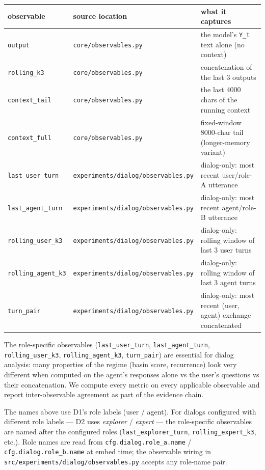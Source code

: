\documentclass{article}
\theoremstyle{plain}
\theoremstyle{definition}
\begin{document}
\begin{table}[h!]
\centering
\small
\begin{tabular}{lll}
\toprule
observable & source location & what it captures \\
\midrule
\texttt{output} & \texttt{core/observables.py} & the model's \texttt{Y\_t} text alone (no context) \\
\texttt{rolling\_k3} & \texttt{core/observables.py} & concatenation of the last 3 outputs \\
\texttt{context\_tail} & \texttt{core/observables.py} & the last 4000 chars of the running context \\
\texttt{context\_full} & \texttt{core/observables.py} & fixed-window 8000-char tail (longer-memory variant) \\
\texttt{last\_user\_turn} & \texttt{experiments/dialog/observables.py} & dialog-only: most recent user/role-A utterance \\
\texttt{last\_agent\_turn} & \texttt{experiments/dialog/observables.py} & dialog-only: most recent agent/role-B utterance \\
\texttt{rolling\_user\_k3} & \texttt{experiments/dialog/observables.py} & dialog-only: rolling window of last 3 user turns \\
\texttt{rolling\_agent\_k3} & \texttt{experiments/dialog/observables.py} & dialog-only: rolling window of last 3 agent turns \\
\texttt{turn\_pair} & \texttt{experiments/dialog/observables.py} & dialog-only: most recent (user, agent) exchange concatenated \\
\bottomrule
\end{tabular}
\end{table}

The role-specific observables (\texttt{last\_user\_turn}, \texttt{last\_agent\_turn},
\texttt{rolling\_user\_k3}, \texttt{rolling\_agent\_k3}, \texttt{turn\_pair}) are essential for
dialog analysis: many properties of the regime (basin score, recurrence)
look very different when computed on the agent's responses alone vs the
user's questions vs their concatenation. We compute every metric on
every applicable observable and report inter-observable agreement as
part of the evidence chain.

The names above use D1's role labels (user / agent). For dialogs
configured with different role labels — D2 uses \textit{explorer} / \textit{expert} —
the role-specific observables are named after the configured roles
(\texttt{last\_explorer\_turn}, \texttt{rolling\_expert\_k3}, etc.). Role names are read
from \texttt{cfg.dialog.role\_a.name} / \texttt{cfg.dialog.role\_b.name} at embed time;
the observable wiring in \texttt{src/experiments/dialog/observables.py} accepts
any role-name pair.
\end{document}
